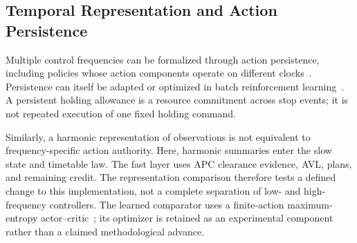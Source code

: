\subsection{Temporal Representation and Action Persistence}
Multiple control frequencies can be formalized through action persistence, including policies whose action components operate on different clocks~\cite{lee2020multiple}. Persistence can itself be adapted or optimized in batch reinforcement learning~\cite{metelli2020persistence}. A persistent holding allowance is a resource commitment across stop events; it is not repeated execution of one fixed holding command.

Similarly, a harmonic representation of observations is not equivalent to frequency-specific action authority. Here, harmonic summaries enter the slow state and timetable law. The fast layer uses APC clearance evidence, AVL, plans, and remaining credit. The representation comparison therefore tests a defined change to this implementation, not a complete separation of low- and high-frequency controllers. The learned comparator uses a finite-action maximum-entropy actor--critic~\cite{haarnoja2018sac,christodoulou2019discrete}; its optimizer is retained as an experimental component rather than a claimed methodological advance.
